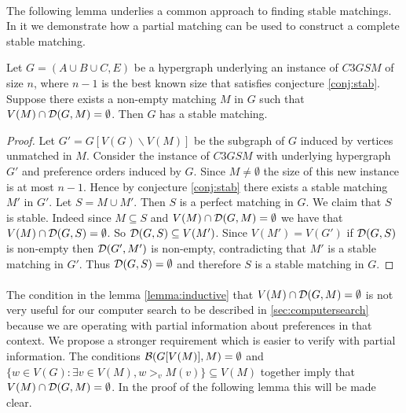 \paragraph{}
The following lemma underlies a common approach to finding stable matchings. In it we demonstrate how a partial matching can be used to construct a complete stable matching.
\begin{lemma}\label{lemma:inductive}
Let $G=(A\cup B \cup C, E)$ be a hypergraph underlying an instance of $C3GSM$ of size $n$, where $n-1$ is the best known size that satisfies conjecture \ref{conj:stab}. Suppose there exists a non-empty matching $M$ in $G$ such that $V(M) \cap \mathcal{D}(G,M) = \emptyset$. Then $G$ has a stable matching.
\end{lemma}
\begin{proof}
Let $G' = G[V(G)\backslash V(M)]$ be the subgraph of $G$ induced by vertices unmatched in $M$.  Consider the instance of $C3GSM$ with underlying hypergraph $G'$ and preference orders induced by $G$. Since $M \neq \emptyset$ the size of this new instance is at most $n-1$. Hence by conjecture \ref{conj:stab} there exists a stable matching $M'$ in $G'$. Let $S = M \cup M'$. Then $S$ is a perfect matching in $G$. We claim that $S$ is stable. Indeed since $M \subseteq S$ and $V(M) \cap \mathcal{D}(G,M) = \emptyset$ we have that $V(M) \cap \mathcal{D}(G,S) = \emptyset$. So $\mathcal{D}(G,S) \subseteq V(M')$. Since $V(M') = V(G')$ if $\mathcal{D}(G,S)$ is non-empty then $\mathcal{D}(G', M')$ is non-empty, contradicting that $M'$ is a stable matching in $G'$. Thus $\mathcal{D}(G,S) = \emptyset$ and therefore $S$ is a stable matching in $G$.
\end{proof}

\paragraph{}
The condition in the lemma \ref{lemma:inductive} that $V(M) \cap \mathcal{D}(G,M) = \emptyset$ is not very useful for our computer search to be described in \ref{sec:computersearch} because we are operating with partial information about preferences in that context. We propose a stronger requirement which is easier to verify with partial information. The conditions $\mathcal{B}(G[V(M)], M) = \emptyset$ and $\{w \in V(G): \exists v \in V(M), w >_v M(v)\} \subseteq V(M)$ together imply that $V(M) \cap \mathcal{D}(G,M) = \emptyset$. In the proof of the following lemma this will be made clear.

